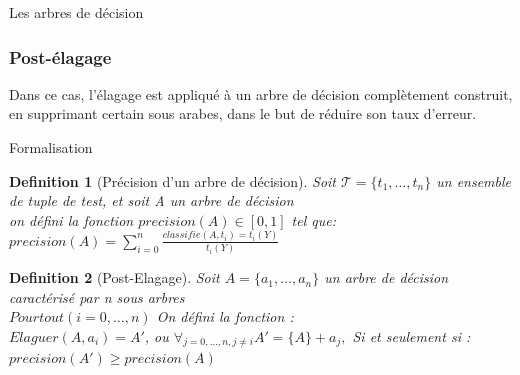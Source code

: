 \documentclass[a4paper, 11pt]{report}
\newtheorem{definition}{Definition}
\newcommand{\tupleset}{\ensuremath{\mathcal{T}}}
\begin{document}
\begin{chapter}{Les arbres de décision}
\begin{itemize}

\end{itemize}

\subsubsection{Post-élagage}

Dans ce cas, l'élagage est appliqué à un arbre de décision complètement construit, en supprimant certain sous arabes, dans le but de réduire son taux d'erreur.\\

\begin{paragraph}{Formalisation}

\begin{definition}[Précision d'un arbre de décision]
Soit $\tupleset=\{t_1,\dots,t_n\}$ un ensemble de tuple de test, et soit A un arbre de décision\\
on défini la fonction $precision(A) \in [0,1]$ tel que: \\
$precision(A) = \sum_{i=0}^n \frac{classifie(A,t_i) = t_i(Y)} {t_i(Y)}$
\end{definition}
\begin{definition}[Post-Elagage]

Soit $A=\{a_1,\dots,a_n\}$ un arbre de décision caractérisé par n sous arbres \\
$Pour tout (i=0, \dots, n)$ On défini la fonction : \\
$Elaguer(A,a_i) = A'$, ou $\forall{_{j=0,\dots,n, j \neq i}} A'=\{A\}+a_j,$  Si et seulement si :\\ 

$precision(A') \geq precision(A)$

\end{definition}


\end{paragraph}
\end{chapter}
\end{document}
